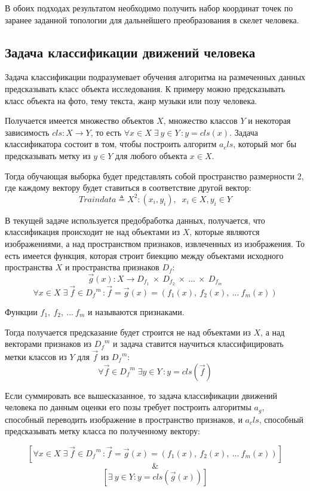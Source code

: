 В обоих подходах результатом необходимо получить набор координат точек по заранее заданной топологии для дальнейшего преобразования в скелет человека.

\subsection{Задача классификации движений человека}
\label{subsec:Theory of classification}

Задача классификации подразумевает обучения алгоритма на размеченных данных предсказывать класс объекта исследования. К примеру можно предсказывать класс объекта на фото, тему текста, жанр музыки или позу человека.

Получается имеется множество объектов $X$, множество классов $Y$ и некоторая зависимость $cls: X \rightarrow Y$, то есть $\forall x \in X\;\exists\:y \in Y\,: y = cls(x)$. Задача классификатора состоит в том, чтобы построить алгоритм $a_cls$, который мог бы предсказывать метку из $y \in Y$ для любого объекта $x \in X$.

Тогда обучающая выборка будет представлять собой пространство размерности 2, где каждому вектору будет ставиться в соответствие другой вектор:
$$Train data 	\triangleq X^2: (x_i, y_i),\;\; x_i \in X, y_i \in Y$$

В текущей задаче используется предобработка данных, получается, что классификация происходит не над объектами из $X$, которые являются изображениями, а над пространством признаков, извлеченных из изображения. То есть имеется функция, которая строит биекцию между объектами исходного пространства $X$ и пространства признаков $D_f$:
$$\vec{g}(x): X \rightarrow D_{f_1}\:\times\:D_{f_2}\:\times\:...\:\times\: D_{f_m}$$
$$\forall x \in X\;\exists\:\vec{f} \in {D_f}^m\,: \vec{f} = \vec{g}(x) = (f_1(x),\:f_2(x),\:...\:f_m(x))$$

Функции $f_1,\:f_2,\:...\:f_m$ и называются признаками.

Тогда получается предсказание будет строится не над объектами из $X$, а над векторами признаков из ${D_f}^m$ и задача ставится научиться классифицировать метки классов из $Y$ для $\vec{f}$ из ${D_f}^m$:
$$\forall \vec{f} \in {D_f}^m\;\exists y \in Y\,: y = cls(\vec{f})$$

Если суммировать все вышесказанное, то задача классификации движений человека по данным оценки его позы требует построить алгоритмы $a_g$, способный переводить изображение в пространство признаков, и $a_cls$, способный предсказывать метку класса по полученному вектору:

$$\left[\forall x \in X\;\exists\:\vec{f} \in {D_f}^m\,: \vec{f} = \vec{g}(x) = (f_1(x),\:f_2(x),\:...\:f_m(x))\right]$$
$$\&$$
$$\left[ \exists\:y \in Y: y = cls(\vec{g}(x)) \right]$$


\newpage